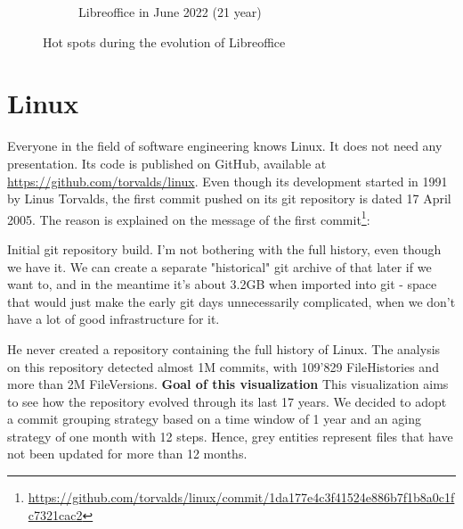 \begin{figure}[ht]
\begin{subfigure}{0.48\textwidth}
        \caption{Libreoffice in June 2022 (21 year)} 
        \label{fig:Libre_V6_S6}
    \end{subfigure}
    
    \caption{Hot spots during the evolution of Libreoffice} 
    \label{fig:Libre_V6}
\end{figure}


\clearpage
\section{Linux}
Everyone in the field of software engineering knows Linux. It does not need any presentation. Its code is published on GitHub, available at \url{https://github.com/torvalds/linux}. Even though its development started in 1991 by Linus Torvalds, the first commit pushed on its git repository is dated 17 April 2005. The reason is explained on the message of the first commit\footnote{\url{https://github.com/torvalds/linux/commit/1da177e4c3f41524e886b7f1b8a0c1fc7321cac2}}:
\begin{displayquote}
    Initial git repository build. I'm not bothering with the full history,
    even though we have it. We can create a separate "historical" git
    archive of that later if we want to, and in the meantime it's about
    3.2GB when imported into git - space that would just make the early
    git days unnecessarily complicated, when we don't have a lot of good
    infrastructure for it.
\end{displayquote}
He never created a repository containing the full history of Linux. The analysis on this repository detected almost 1M commits, with 109'829 FileHistories and more than 2M FileVersions. 
\newline
\textbf{Goal of this visualization}
This visualization aims to see how the repository evolved through its last 17 years. We decided to adopt a commit grouping strategy based on a time window of 1 year and an aging strategy of one month with 12 steps. Hence, grey entities represent files that have not been updated for more than 12 months. 


